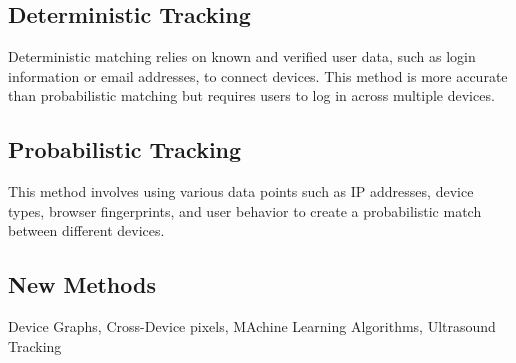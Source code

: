 \subsection{Deterministic Tracking}
Deterministic matching relies on known and verified user data, such as login information or email addresses, to connect devices. This method is more accurate than probabilistic matching but requires users to log in across multiple devices.

\subsection{Probabilistic Tracking}
This method involves using various data points such as IP addresses, device types, browser fingerprints, and user behavior to create a probabilistic match between different devices.

\subsection{New Methods}
Device Graphs, Cross-Device pixels, MAchine Learning Algorithms, Ultrasound Tracking